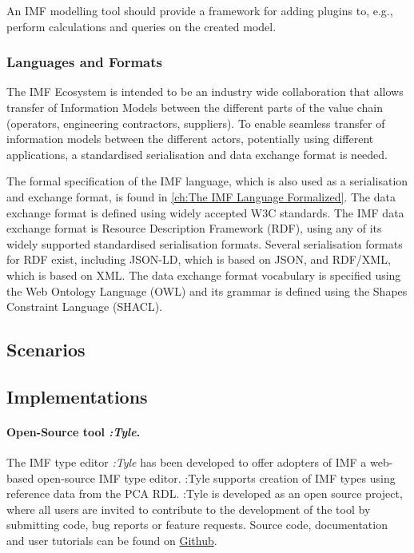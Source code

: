 An IMF modelling tool should provide a framework for adding plugins to, e.g., perform calculations and queries on the created
model.

\subsubsection{Languages and Formats}
\label{sec:languages-formats}


The IMF Ecosystem is intended to be an industry wide collaboration that allows transfer
of Information Models between the different parts of the value chain (operators, engineering contractors, suppliers).
To enable seamless transfer of information models between the different actors, potentially using different
applications, a standardised serialisation and data exchange format is needed.

The formal specification of the IMF language, which is also used as a serialisation and exchange format, is found in \autoref{ch:The IMF Language Formalized}.
The data exchange format is defined using widely accepted W3C standards. The IMF data exchange format is Resource
Description Framework (RDF), using any of its widely supported standardised serialisation formats. Several
serialisation formats for RDF exist, including JSON-LD, which is based on JSON, and RDF/XML, which is based on XML.
The data exchange format vocabulary is specified using the Web Ontology Language (OWL) and its grammar is
defined using the Shapes Constraint Language (SHACL).


\subsection{Scenarios}
\label{sec:scenarios}



\subsection{Implementations}
\label{sec:implementations}

\paragraph{Open-Source tool \emph{:Tyle}.}

The IMF type editor \emph{:Tyle} has been developed to offer adopters of IMF a web-based open-source IMF type
editor. :Tyle supports creation of IMF types using reference data from the PCA RDL.
:Tyle is developed as an open source project, where all users are
invited to contribute to the development of the tool by submitting code, bug reports or feature requests. Source
code, documentation and user tutorials can be found on
\href{https://github.com/mimir-org/typelibrary}{Github}.



